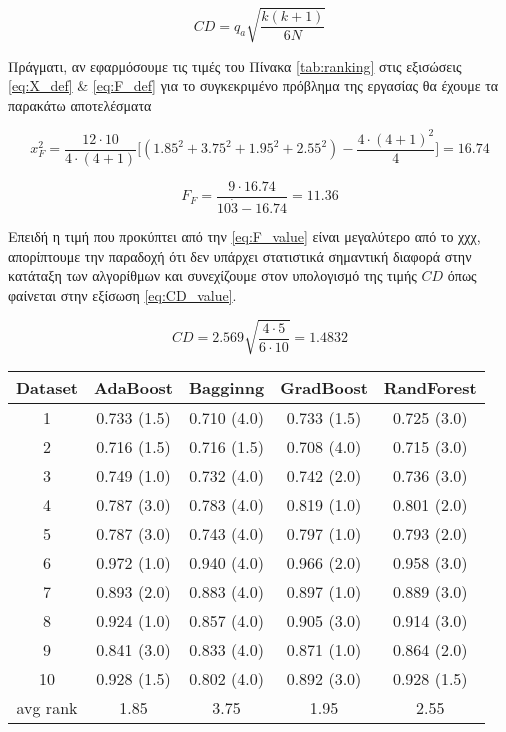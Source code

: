 \begin{equation}
\label{eq:CD_def}
	CD = q_a\sqrt{\frac{k(k+1)}{6N}}
\end{equation}


Πράγματι, αν εφαρμόσουμε τις τιμές του Πίνακα \ref{tab:ranking} στις εξισώσεις 
\ref{eq:X_def} \& \ref{eq:F_def} για το συγκεκριμένο πρόβλημα της εργασίας θα έχουμε τα παρακάτω αποτελέσματα

\begin{equation}
\label{eq:X_value}
x_F^2 = \frac{12\cdot 10}{4\cdot(4+1)}\Big[ (1.85^2+3.75^2+1.95^2+2.55^2) - \frac{4\cdot(4+1)^2}{4} \Big]  = 16.74
\end{equation}

\begin{equation}
\label{eq:F_value}
F_F = \frac{9 \cdot 16.74}{10 \dot 3 - 16.74} = 11.36
\end{equation}

Επειδή η τιμή που προκύπτει από την \ref{eq:F_value} είναι μεγαλύτερο από το χχχ, απορίπτουμε την παραδοχή ότι δεν υπάρχει στατιστικά σημαντική διαφορά στην κατάταξη των αλγορίθμων και συνεχίζουμε στον υπολογισμό της τιμής $CD$ όπως φαίνεται στην εξίσωση \ref{eq:CD_value}.

\begin{equation}
\label{eq:CD_value}
CD = 2.569\sqrt{\frac{4\cdot 5}{6 \cdot 10}} = 1.4832
\end{equation}

\begin{table*}
	\centering
	\caption{Αποτελέσματα και κατάταξη αλγορίθμων}
	\label{tab:ranking}
	\begin{tabular}{ccccc}
		\hline
		\ttfamily Dataset & \ttfamily AdaBoost & \ttfamily Bagginng & \ttfamily GradBoost & \ttfamily RandForest
		\\	\hline
		1&	0.733 (1.5)&    0.710 (4.0) &	0.733 (1.5)&	0.725 (3.0) \\ \hline
		2&	0.716 (1.5)&    0.716 (1.5) &	0.708 (4.0)&	0.715 (3.0)\\ \hline
		3&	0.749 (1.0)&	0.732 (4.0)&	0.742 (2.0)&	0.736 (3.0) \\ \hline
		4&	0.787 (3.0)&	0.783 (4.0)&	0.819 (1.0)&	0.801 (2.0)\\ \hline
		5&	0.787 (3.0)&	0.743 (4.0)&	0.797 (1.0)&	0.793 (2.0)\\ \hline
		6&	0.972 (1.0)&	0.940 (4.0)&	0.966 (2.0)&	0.958 (3.0)\\ \hline
		7&	0.893 (2.0)&	0.883 (4.0)&	0.897 (1.0)&	0.889 (3.0)\\ \hline
		8&	0.924 (1.0)&	0.857 (4.0)&	0.905 (3.0)&	0.914 (3.0)\\ \hline
		9&	0.841 (3.0)&	0.833 (4.0)&	0.871 (1.0)&	0.864 (2.0)\\ \hline
		10&	0.928 (1.5)&	0.802 (4.0)&	0.892 (3.0)&	0.928 (1.5)\\ \hline
		avg rank&1.85 &	3.75 & 1.95 & 2.55
		\\ \hline
	\end{tabular}
\end{table*}

